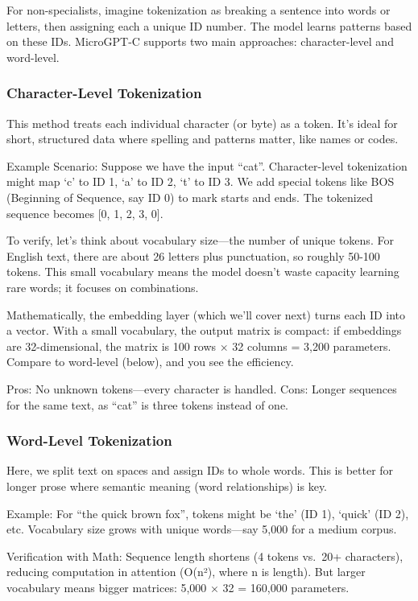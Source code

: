 \documentclass[
]{article}
\begin{document}
For non-specialists, imagine tokenization as breaking a sentence into
words or letters, then assigning each a unique ID number. The model
learns patterns based on these IDs. MicroGPT-C supports two main
approaches: character-level and word-level.

\subsubsection{Character-Level
Tokenization}\label{character-level-tokenization}

This method treats each individual character (or byte) as a token. It's
ideal for short, structured data where spelling and patterns matter,
like names or codes.

Example Scenario: Suppose we have the input ``cat''. Character-level
tokenization might map `c' to ID 1, `a' to ID 2, `t' to ID 3. We add
special tokens like BOS (Beginning of Sequence, say ID 0) to mark starts
and ends. The tokenized sequence becomes {[}0, 1, 2, 3, 0{]}.

To verify, let's think about vocabulary size---the number of unique
tokens. For English text, there are about 26 letters plus punctuation,
so roughly 50-100 tokens. This small vocabulary means the model doesn't
waste capacity learning rare words; it focuses on combinations.

Mathematically, the embedding layer (which we'll cover next) turns each
ID into a vector. With a small vocabulary, the output matrix is compact:
if embeddings are 32-dimensional, the matrix is 100 rows × 32 columns =
3,200 parameters. Compare to word-level (below), and you see the
efficiency.

Pros: No unknown tokens---every character is handled. Cons: Longer
sequences for the same text, as ``cat'' is three tokens instead of one.

\subsubsection{Word-Level Tokenization}\label{word-level-tokenization}

Here, we split text on spaces and assign IDs to whole words. This is
better for longer prose where semantic meaning (word relationships) is
key.

Example: For ``the quick brown fox'', tokens might be `the' (ID 1),
`quick' (ID 2), etc. Vocabulary size grows with unique words---say 5,000
for a medium corpus.

Verification with Math: Sequence length shortens (4 tokens vs.~20+
characters), reducing computation in attention (O(n²), where n is
length). But larger vocabulary means bigger matrices: 5,000 × 32 =
160,000 parameters.
\end{document}
